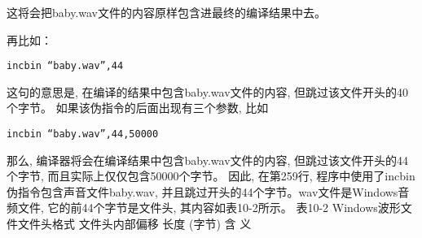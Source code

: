 \documentclass[12pt]{article}
\begin{document}
\begin{CJK}{UTF8}{gbsn}
这将会把baby.wav文件的内容原样包含进最终的编译结果中去。

再比如：

\begin{verbatim}
incbin “baby.wav”,44
\end{verbatim}

这句的意思是, 在编译的结果中包含baby.wav文件的内容, 但跳过该文件开头的40个字节。
如果该伪指令的后面出现有三个参数, 比如

\begin{verbatim}
incbin “baby.wav”,44,50000
\end{verbatim}

那么, 编译器将会在编译结果中包含baby.wav文件的内容, 但跳过该文件开头的44个字节, 而且实际上仅仅包含50000个字节。
因此, 在第259行, 程序中使用了incbin伪指令包含声音文件baby.wav, 并且跳过开头的44个字节。wav文件是Windows音频文件, 它的前44个字节是文件头, 其内容如表10-2所示。
表10-2  Windows波形文件文件头格式
文件头内部偏移	长度 (字节) 	含    义
\begin{comment}
0x00	4	字符串“RIFF”
0x04	4	文件长度
0x08	4	字符串“WAVE”
0x0c	4	字符串“fmt ”, 该串表明这里是音频格式部分的开始
0x10	4	音频格式部分的长度
0x14	2	编码格式 (0x01：PCM) 
0x16	2	声道数量
0x18	4	采样率 (样本生成速度, 即, 采样次数/秒) 
0x1c	4	数据率 (采样或回放时, 每秒的字节数) 
0x20	2	数据块大小 (样本宽度/8 ×声道数) 
0x22	2	样本宽度 (8、16或者32, 指每个样本的比特数) 
0x24	4	字符串“data”, 该串表明这里是音频数据部分的开始
0x28	4	实际的数字音频数据长度

讲述wav文件的文件头格式时, 结合一个实际的例子可能是个好主意。好吧, 让我们来看看本书中用到的baby.wav。用配书工具hexview打开它, 显示的内容如图10-8所示。
 
图10-8  以十六进制形式显示的baby.wav文件内容


\end{comment}
\end{CJK}
\end{document}
